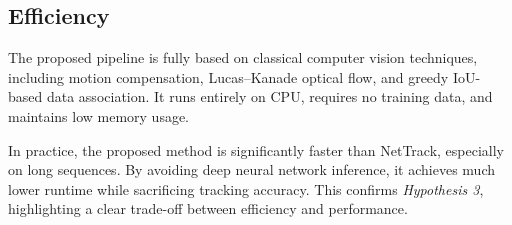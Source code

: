 \subsection{Efficiency}
\label{subsec:efficiency}

The proposed pipeline is fully based on classical computer vision techniques,
including motion compensation, Lucas--Kanade optical flow, and greedy IoU-based
data association.
It runs entirely on CPU, requires no training data, and maintains low memory usage.

In practice, the proposed method is significantly faster than NetTrack,
especially on long sequences.
By avoiding deep neural network inference, it achieves much lower runtime while
sacrificing tracking accuracy.
This confirms \textit{Hypothesis 3}, highlighting a clear trade-off between efficiency
and performance.